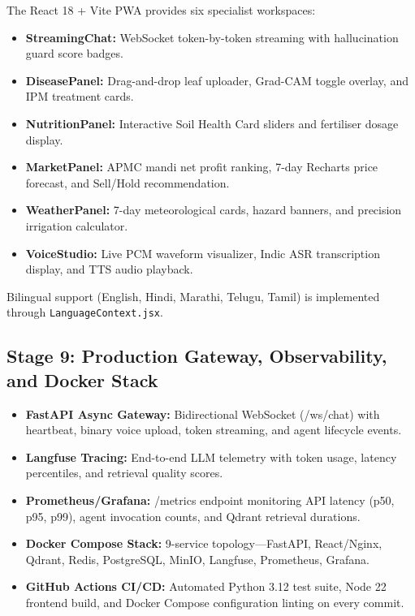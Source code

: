 \documentclass[12pt,a4paper]{article}
\begin{document}
The React 18 + Vite PWA provides six specialist workspaces:
\begin{itemize}
\item \textbf{StreamingChat:} WebSocket token-by-token streaming with hallucination guard score badges.
\item \textbf{DiseasePanel:} Drag-and-drop leaf uploader, Grad-CAM toggle overlay, and IPM treatment cards.
\item \textbf{NutritionPanel:} Interactive Soil Health Card sliders and fertiliser dosage display.
\item \textbf{MarketPanel:} APMC mandi net profit ranking, 7-day Recharts price forecast, and Sell/Hold recommendation.
\item \textbf{WeatherPanel:} 7-day meteorological cards, hazard banners, and precision irrigation calculator.
\item \textbf{VoiceStudio:} Live PCM waveform visualizer, Indic ASR transcription display, and TTS audio playback.
\end{itemize}
Bilingual support (English, Hindi, Marathi, Telugu, Tamil) is implemented through \texttt{LanguageContext.jsx}.

\subsection{Stage 9: Production Gateway, Observability, and Docker Stack}

\begin{itemize}
\item \textbf{FastAPI Async Gateway:} Bidirectional WebSocket (/ws/chat) with heartbeat, binary voice upload, token streaming, and agent lifecycle events.
\item \textbf{Langfuse Tracing:} End-to-end LLM telemetry with token usage, latency percentiles, and retrieval quality scores.
\item \textbf{Prometheus/Grafana:} /metrics endpoint monitoring API latency (p50, p95, p99), agent invocation counts, and Qdrant retrieval durations.
\item \textbf{Docker Compose Stack:} 9-service topology---FastAPI, React/Nginx, Qdrant, Redis, PostgreSQL, MinIO, Langfuse, Prometheus, Grafana.
\item \textbf{GitHub Actions CI/CD:} Automated Python 3.12 test suite, Node 22 frontend build, and Docker Compose configuration linting on every commit.
\end{itemize}


\clearpage
\end{document}
